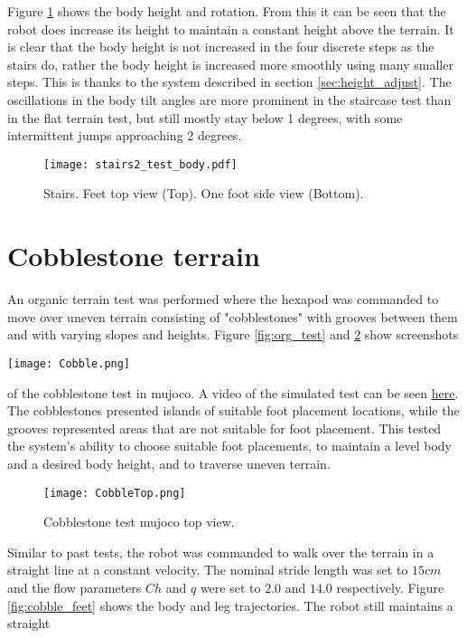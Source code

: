     \noindent
    Figure \ref{fig:stairs_body} shows the body height and rotation. From this it can be seen that the robot does increase its height to maintain a constant height above the terrain. It is clear that the body height is not increased in the four discrete steps as the stairs do, rather the body height is increased more smoothly using many smaller steps. This is thanks to the system described in section \ref{sec:height_adjust}.
    The oscillations in the body tilt angles are more prominent in the staircase test than in the flat terrain test, but still mostly stay below 1 degrees, with some intermittent jumps approaching 2 degrees.
    \begin{figure}[h]
        \centering
        \texttt{[image: stairs2\_test\_body.pdf]}
        \caption{Stairs. Feet top view (Top). One foot side view (Bottom).}
        \label{fig:stairs_body}
    \end{figure}

    \section{Cobblestone terrain}
    An organic terrain test was performed where the hexapod was commanded to move over uneven terrain consisting of "cobblestones" with grooves between them and with varying slopes and heights. Figure \ref{fig:org_test} and \ref{fig:org_test_top} show screenshots
    \begin{center}
        \texttt{[image: Cobble.png]}
        \label{fig:org_test}
    \end{center}
    of the cobblestone test in \ac{mujoco}. A video of the simulated test can be seen \href{https://youtu.be/-lQjvykGlmY}{\color{blue}\underline{here}}. The cobblestones presented islands of suitable foot placement locations, while the grooves represented areas that are not suitable for foot placement. This tested the system's ability to choose suitable foot placements, to maintain a level body and a desired body height, and to traverse uneven terrain.
    \begin{figure}[h]
        \centering
        \texttt{[image: CobbleTop.png]}
        \caption{Cobblestone test \ac{mujoco} top view.}
        \label{fig:org_test_top}
    \end{figure}

    \noindent
    Similar to past tests, the robot was commanded to walk over the terrain in a straight line at a constant velocity. The nominal stride length was set to \(15cm\) and the flow parameters \(Ch\) and \(q\) were set to \(2.0\) and \(14.0\) respectively. Figure \ref{fig:cobble_feet} shows the body and leg trajectories. The robot still maintains a straight

